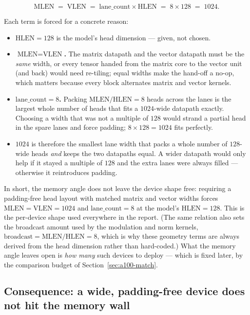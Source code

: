\documentclass[11pt]{report}
\begin{document}
\[
\boxed{\;\text{MLEN} \;=\; \text{VLEN} \;=\; \text{lane\_count} \times \text{HLEN} \;=\; 8 \times 128 \;=\; 1024.\;}
\]

Each term is forced for a concrete reason:

\begin{itemize}
\item \textbf{$\text{HLEN}=128$} is the model's head dimension --- given, not
chosen.
\item \textbf{$\text{MLEN}=\text{VLEN}$.} The matrix datapath and the vector
datapath must be the \emph{same} width, or every tensor handed from the
matrix core to the vector unit (and back) would need re-tiling; equal
widths make the hand-off a no-op, which matters because every block
alternates matrix and vector kernels.
\item \textbf{$\text{lane\_count}=8$.} Packing $\text{MLEN}/\text{HLEN}=8$
heads across the lanes is the largest whole number of heads that fits a
$1024$-wide datapath exactly. Choosing a width that was not a multiple of
$128$ would strand a partial head in the spare lanes and force padding;
$8\times128=1024$ fits perfectly.
\item \textbf{$1024$} is therefore the smallest lane width that packs a
whole number of $128$-wide heads \emph{and} keeps the two datapaths equal.
A wider datapath would only help if it stayed a multiple of $128$ and the
extra lanes were always filled --- otherwise it reintroduces padding.
\end{itemize}

In short, the memory angle does not leave the device shape free: requiring a
padding-free head layout with matched matrix and vector widths forces
$\text{MLEN}=\text{VLEN}=1024$ and $\text{lane\_count}=8$ at the model's
$\text{HLEN}=128$. This is the per-device shape used everywhere in the
report. (The same relation also sets the broadcast amount used by the
modulation and norm kernels, $\text{broadcast}=\text{MLEN}/\text{HLEN}=8$,
which is why these geometry terms are always derived from the head
dimension rather than hard-coded.) What the memory angle leaves open is
\emph{how many} such devices to deploy --- which is fixed later, by the
comparison budget of Section~\ref{sec:a100-match}.

\subsection{Consequence: a wide, padding-free device does not hit the memory wall}
\end{document}
